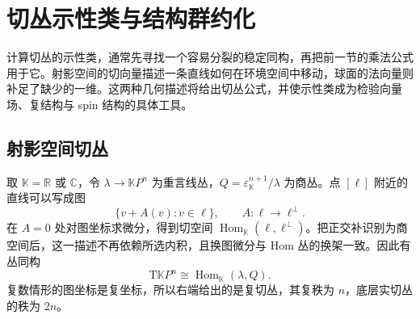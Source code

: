 
% 
% 

\section{切丛示性类与结构群约化}
\label{g2:sec:2104}

计算切丛的示性类，通常先寻找一个容易分裂的稳定同构，再把前一节的乘法公式用于它。射影空间的切向量描述一条直线如何在环境空间中移动，球面的法向量则补足了缺少的一维。这两种几何描述将给出切丛公式，并使示性类成为检验向量场、复结构与 spin 结构的具体工具。

\subsection{射影空间切丛}
\label{g2:subsec:2104:01}
取 \(\mathbb K=\mathbb R\) 或 \(\mathbb C\)，令 \(\lambda\to\mathbb KP^n\) 为重言线丛，\(Q=\varepsilon_{\mathbb K}^{n+1}/\lambda\) 为商丛。点 \([\ell]\) 附近的直线可以写成图
\[
	\{v+A(v):v\in\ell\},\qquad A:\ell\longrightarrow\ell^\perp.
\]
在 \(A=0\) 处对图坐标求微分，得到切空间 \(\operatorname{Hom}_{\mathbb K}(\ell,\ell^\perp)\)。把正交补识别为商空间后，这一描述不再依赖所选内积，且换图微分与 Hom 丛的换架一致。因此有丛同构
\begin{equation}\label{g2:eq:projective-tangent-hom}
	\mathrm T\mathbb KP^n\cong\operatorname{Hom}_{\mathbb K}(\lambda,Q).
\end{equation}
复数情形的图坐标是复坐标，所以右端给出的是复切丛，其复秩为 \(n\)，底层实切丛的秩为 \(2n\)。


